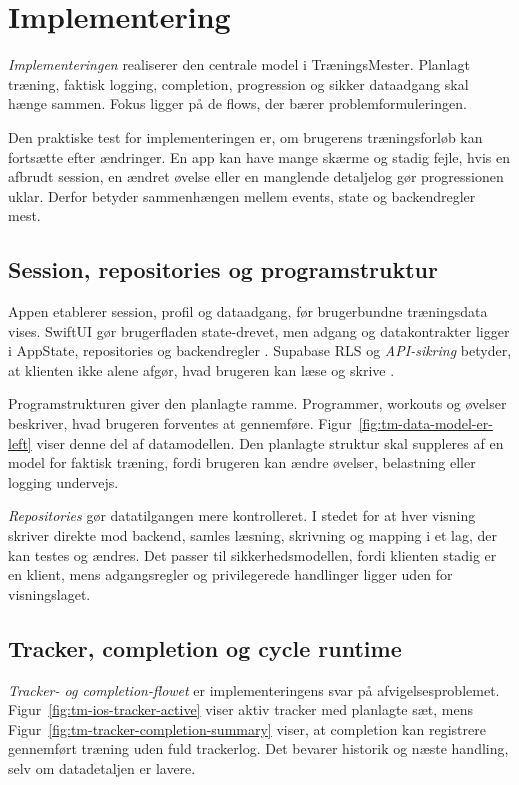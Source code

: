 \section{Implementering}

\emph{Implementeringen} realiserer den centrale model i TræningsMester. Planlagt træning, faktisk logging, completion, progression og sikker dataadgang skal hænge sammen. Fokus ligger på de flows, der bærer problemformuleringen.

Den praktiske test for implementeringen er, om brugerens træningsforløb kan fortsætte efter ændringer. En app kan have mange skærme og stadig fejle, hvis en afbrudt session, en ændret øvelse eller en manglende detaljelog gør progressionen uklar. Derfor betyder sammenhængen mellem events, state og backendregler mest.

\subsection{Session, repositories og programstruktur}

Appen etablerer session, profil og dataadgang, før brugerbundne træningsdata vises. SwiftUI gør brugerfladen state-drevet, men adgang og datakontrakter ligger i AppState, repositories og backendregler \cite{apple_swiftui_docs}. Supabase RLS og \emph{API-sikring} betyder, at klienten ikke alene afgør, hvad brugeren kan læse og skrive \cite{supabase_rls_docs,supabase_securing_api_docs}.

Programstrukturen giver den planlagte ramme. Programmer, workouts og øvelser beskriver, hvad brugeren forventes at gennemføre. Figur~\ref{fig:tm-data-model-er-left} viser denne del af datamodellen. Den planlagte struktur skal suppleres af en model for faktisk træning, fordi brugeren kan ændre øvelser, belastning eller logging undervejs.

\emph{Repositories} gør datatilgangen mere kontrolleret. I stedet for at hver visning skriver direkte mod backend, samles læsning, skrivning og mapping i et lag, der kan testes og ændres. Det passer til sikkerhedsmodellen, fordi klienten stadig er en klient, mens adgangsregler og privilegerede handlinger ligger uden for visningslaget.

\subsection{Tracker, completion og cycle runtime}

\emph{Tracker- og completion-flowet} er implementeringens svar på afvigelsesproblemet. Figur~\ref{fig:tm-ios-tracker-active} viser aktiv tracker med planlagte sæt, mens Figur~\ref{fig:tm-tracker-completion-summary} viser, at completion kan registrere gennemført træning uden fuld trackerlog. Det bevarer historik og næste handling, selv om datadetaljen er lavere.

